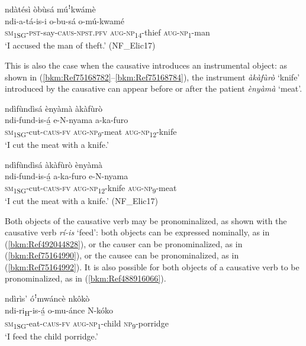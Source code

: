 \ea
\label{bkm:Ref98833423}
ndàtésì òbùsá múꜝkwámè\\
\gll ndi-a-tá-is-i        o-bu-sá    o-mú-kwamé\\
\textsc{sm}\textsubscript{1SG}-\textsc{pst}-say-\textsc{caus}-\textsc{npst}.\textsc{pfv}  \textsc{aug}-\textsc{np}\textsubscript{14}-thief  \textsc{aug}-\textsc{np}\textsubscript{1}-man\\
\glt ‘I accused the man of theft.’ (NF\_Elic17)
\z

This is also the case when the causative introduces an instrumental object: as shown in (\ref{bkm:Ref75168782}--\ref{bkm:Ref75168784}), the instrument \textit{àkàfùrò} ‘knife’ introduced by the causative can appear before or after the patient \textit{ènyàmà} ‘meat’.

\ea
\label{bkm:Ref75168782}
ndìfùndìsá ènyàmà àkàfùrò\\
\gll ndi-fund-is-á̲  e-N-nyama    a-ka-furo\\
\textsc{sm}\textsubscript{1SG}-cut-\textsc{caus}-\textsc{fv}  \textsc{aug}-\textsc{np}\textsubscript{9}-meat  \textsc{aug}-\textsc{np}\textsubscript{12}-knife\\
\glt ‘I cut the meat with a knife.’
\z

\ea
\label{bkm:Ref75168784}
ndìfùndìsá àkàfùrò ènyàmà\\
\gll ndi-fund-is-á̲  a-ka-furo    e-N-nyama\\
\textsc{sm}\textsubscript{1SG}-cut-\textsc{caus}-\textsc{fv}  \textsc{aug}-\textsc{np}\textsubscript{12}-knife  \textsc{aug}-\textsc{np}\textsubscript{9}-meat\\
\glt ‘I cut the meat with a knife.’ (NF\_Elic17)
\z

Both objects of the causative verb may be pronominalized, as shown with the causative verb \textit{rí-is} ‘feed’: both objects can be expressed nominally, as in (\ref{bkm:Ref492044828}), or the causer can be pronominalized, as in (\ref{bkm:Ref75164990}), or the causee can be pronominalized, as in (\ref{bkm:Ref75164992}). It is also possible for both objects of a causative verb to be pronominalized, as in (\ref{bkm:Ref488916066}).

\ea
\label{bkm:Ref492044828}
ndìrìs’ óꜝmwáncè nkôkò\\
\gll ndi-ri\textsubscript{H}-is-á̲    o-mu-ánce    N-kóko\\
\textsc{sm}\textsubscript{1SG}-eat-\textsc{caus}-\textsc{fv}  \textsc{aug}-\textsc{np}\textsubscript{1}-child  \textsc{np}\-\textsubscript{9}-porridge\\
\glt ‘I feed the child porridge.’
\z

